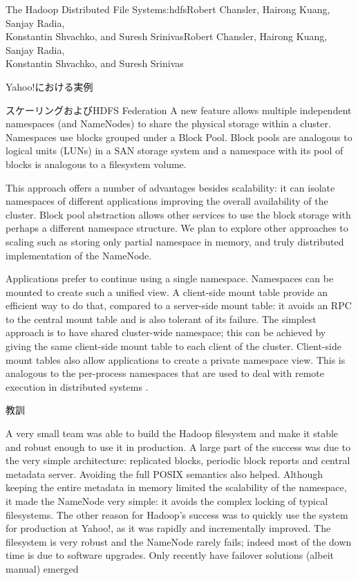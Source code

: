 \begin{aosachaptertoc}{The Hadoop Distributed File System}{s:hdfs}{Robert Chansler, Hairong Kuang, Sanjay Radia, \\ Konstantin Shvachko, and Suresh Srinivas}{Robert Chansler, Hairong Kuang, Sanjay Radia, \\ \hspace*{0.9cm} Konstantin Shvachko, and Suresh Srinivas}
\begin{aosasect1}{Yahoo!における実例}
\begin{aosasect2}{スケーリングおよびHDFS Federation}
A new feature allows multiple independent namespaces (and NameNodes)
to share the physical storage within a cluster. Namespaces use blocks
grouped under a Block Pool. Block pools are analogous to logical units (LUNs) in a SAN
storage system and a namespace with its pool of blocks is analogous to
a filesystem volume.

This approach offers a number of advantages besides scalability: it
can isolate namespaces of different applications improving the overall
availability of the cluster. Block pool abstraction allows other
services to use the block storage with perhaps a different namespace
structure. We plan to explore other approaches to scaling such as
storing only partial namespace in memory, and truly distributed
implementation of the NameNode.

Applications prefer to continue using a single namespace. Namespaces
can be mounted to create such a unified view. A client-side mount
table provide an efficient way to do that, compared to a server-side
mount table: it avoids an RPC to the central mount table and is also
tolerant of its failure. The simplest approach is to have shared
cluster-wide namespace; this can be achieved by giving the same
client-side mount table to each client of the cluster. Client-side
mount tables also allow applications to create a private namespace
view. This is analogous to the per-process namespaces that are used to
deal with remote execution in distributed systems
\cite{bib:pike:names,bib:radia:naming,bib:radia:naming2}.

\end{aosasect2}

\end{aosasect1}

\begin{aosasect1}{教訓}

A very small team was able to build the Hadoop filesystem and make it
stable and robust enough to use it in production.  A large part of the
success was due to the very simple architecture: replicated blocks,
periodic block reports and central metadata server. Avoiding the full
POSIX semantics also helped. Although keeping the entire metadata in
memory limited the scalability of the namespace, it made the NameNode
very simple: it avoids the complex locking of typical filesystems. The
other reason for Hadoop's success was to quickly use the system for
production at Yahoo!, as it was rapidly and incrementally
improved. The filesystem is very robust and the NameNode rarely fails;
indeed most of the down time is due to software upgrades. Only
recently have failover solutions (albeit manual) emerged


\end{aosasect1}
\end{aosachaptertoc}
